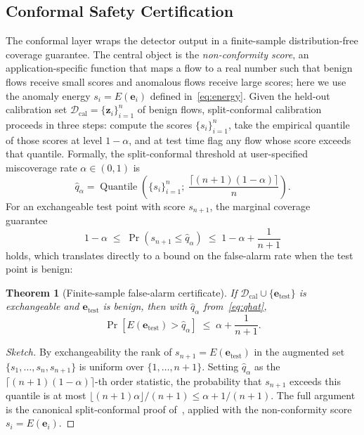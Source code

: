 \documentclass[journal,twoside]{IEEEtran}
\newtheorem{theorem}{Theorem}
\DeclareMathOperator{\Quantile}{Quantile}
\begin{document}
\subsection{Conformal Safety Certification}
\label{sec:method:certify}
The conformal layer wraps the detector output in a finite-sample
distribution-free coverage guarantee. The central object is the
\emph{non-conformity score}, an application-specific function that maps a
flow to a real number such that benign flows receive small scores and
anomalous flows receive large scores; here we use the anomaly energy
$s_i = E(\mathbf{e}_i)$ defined in~\eqref{eq:energy}. Given the held-out
calibration set $\mathcal{D}_\text{cal} = \{\mathbf{z}_i\}_{i=1}^n$ of
benign flows, split-conformal calibration proceeds in three steps:
compute the scores $\{s_i\}_{i=1}^n$, take the empirical quantile of
those scores at level $1-\alpha$, and at test time flag any flow whose
score exceeds that quantile. Formally, the split-conformal threshold at
user-specified miscoverage rate $\alpha \in (0,1)$ is
\begin{equation}
\hat{q}_\alpha = \Quantile\!\left(\{s_i\}_{i=1}^n;\; \frac{\lceil(n+1)(1-\alpha)\rceil}{n}\right).
\label{eq:qhat}
\end{equation}
For an exchangeable test point with score $s_{n+1}$, the marginal
coverage guarantee~\cite{vovk2022alrw,angelopoulos2023gentle}
\begin{equation}
1 - \alpha \;\le\; \Pr(s_{n+1} \le \hat{q}_\alpha) \;\le\; 1 - \alpha + \frac{1}{n+1}
\label{eq:cpguarantee}
\end{equation}
holds, which translates directly to a bound on the false-alarm rate when
the test point is benign:

\begin{theorem}[Finite-sample false-alarm certificate]
\label{thm:far}
If $\mathcal{D}_\text{cal} \cup \{\mathbf{e}_\text{test}\}$ is exchangeable
and $\mathbf{e}_\text{test}$ is benign, then with $\hat{q}_\alpha$
from~\eqref{eq:qhat},
\begin{equation}
\Pr\!\left[E(\mathbf{e}_\text{test}) > \hat{q}_\alpha\right] \;\le\; \alpha + \frac{1}{n+1}.
\end{equation}
\end{theorem}

\begin{proof}[Sketch]
By exchangeability the rank of $s_{n+1} = E(\mathbf{e}_\text{test})$ in
the augmented set $\{s_1,\dots,s_n,s_{n+1}\}$ is uniform over
$\{1,\dots,n+1\}$. Setting $\hat{q}_\alpha$ as the
$\lceil(n+1)(1-\alpha)\rceil$-th order statistic, the probability that
$s_{n+1}$ exceeds this quantile is at most
$\lfloor(n+1)\alpha\rfloor/(n+1) \le \alpha + 1/(n+1)$. The full argument
is the canonical split-conformal proof
of~\cite{vovk2022alrw,angelopoulos2023gentle}, applied with the
non-conformity score $s_i = E(\mathbf{e}_i)$.
\end{proof}
\end{document}
